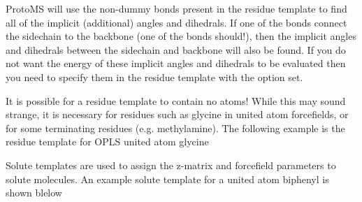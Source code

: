\documentclass[letterpaper,10pt,english]{sphinxmanual}
\begin{document}
ProtoMS will use the non-dummy bonds present in the residue template to find all of the implicit (additional) angles and dihedrals. If one of the bonds connect the sidechain to the backbone (one of the bonds should!), then the implicit angles and dihedrals between the sidechain and backbone will also be found. If you do not want the energy of these implicit angles and dihedrals to be evaluated then you need to specify them in the residue template with the  option set.

It is possible for a residue template to contain no atoms! While this may sound strange, it is necessary for residues such as glycine in united atom forcefields, or for some terminating residues (e.g. methylamine). The following example is the residue template for OPLS united atom glycine

%
\begin{sphinxVerbatim}[commandchars=\\\{\}]
 
 
    
        
\end{sphinxVerbatim}


Solute templates are used to assign the z-matrix and forcefield parameters to solute molecules. An example solute template for a united atom biphenyl is shown blelow
\end{document}
